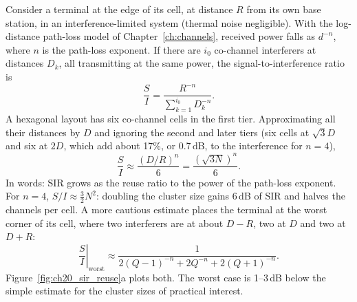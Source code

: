 Consider a terminal at the edge of its cell, at distance $R$ from its own base station, in an
interference-limited system (thermal noise negligible). With the log-distance path-loss model of
Chapter~\ref{ch:channels}, received power falls as $d^{-n}$, where $n$ is the path-loss exponent. If
there are $i_0$ co-channel interferers at distances $D_k$, all transmitting at the same power, the
signal-to-interference ratio is
\begin{equation}
\frac SI=\frac{R^{-n}}{\sum_{k=1}^{i_0}D_k^{-n}} .
\label{eq:ch20:sirgeneral}
\end{equation}
A hexagonal layout has six co-channel cells in the first tier. Approximating all their distances by $D$
and ignoring the second and later tiers (six cells at $\sqrt3D$ and six at $2D$, which add about 17\%, or 0.7\,dB,
to the interference for $n=4$),
\begin{equation}
\frac SI\approx\frac{(D/R)^n}{6}=\frac{\left(\sqrt{3N}\right)^{n}}{6}.
\label{eq:ch20:sir}
\end{equation}
In words: SIR grows as the reuse ratio to the power of the path-loss exponent. For $n=4$,
$S/I\approx\frac32N^2$: doubling the cluster size gains 6\,dB of SIR and halves the channels per cell.
A more cautious estimate places the terminal at the worst corner of its cell, where two interferers are
at about $D-R$, two at $D$ and two at $D+R$:
\begin{equation}
\left.\frac SI\right|_{\text{worst}}\approx\frac{1}{2(Q-1)^{-n}+2Q^{-n}+2(Q+1)^{-n}} .
\label{eq:ch20:sirworst}
\end{equation}
Figure~\ref{fig:ch20_sir_reuse}a plots both. The worst case is 1--3\,dB below the simple estimate for the
cluster sizes of practical interest.



